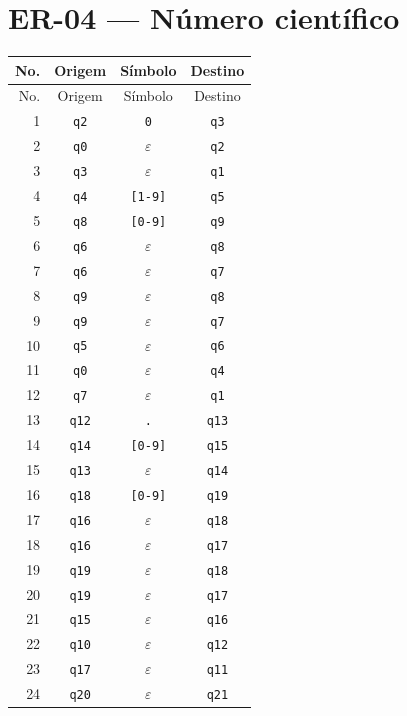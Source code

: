 \documentclass[12pt,a4paper,oneside]{report}
\begin{document}
\section{ER-04 --- Número científico}
\small
\begin{longtable}{|r|c|c|c|}
\toprule
No. & Origem & Símbolo & Destino \\
\midrule
\endfirsthead
\toprule
No. & Origem & Símbolo & Destino \\
\midrule
\endhead
1 & \texttt{q2} & \texttt{0} & \texttt{q3} \\
2 & \texttt{q0} & $\varepsilon$ & \texttt{q2} \\
3 & \texttt{q3} & $\varepsilon$ & \texttt{q1} \\
4 & \texttt{q4} & \texttt{[1-9]} & \texttt{q5} \\
5 & \texttt{q8} & \texttt{[0-9]} & \texttt{q9} \\
6 & \texttt{q6} & $\varepsilon$ & \texttt{q8} \\
7 & \texttt{q6} & $\varepsilon$ & \texttt{q7} \\
8 & \texttt{q9} & $\varepsilon$ & \texttt{q8} \\
9 & \texttt{q9} & $\varepsilon$ & \texttt{q7} \\
10 & \texttt{q5} & $\varepsilon$ & \texttt{q6} \\
11 & \texttt{q0} & $\varepsilon$ & \texttt{q4} \\
12 & \texttt{q7} & $\varepsilon$ & \texttt{q1} \\
13 & \texttt{q12} & \texttt{.} & \texttt{q13} \\
14 & \texttt{q14} & \texttt{[0-9]} & \texttt{q15} \\
15 & \texttt{q13} & $\varepsilon$ & \texttt{q14} \\
16 & \texttt{q18} & \texttt{[0-9]} & \texttt{q19} \\
17 & \texttt{q16} & $\varepsilon$ & \texttt{q18} \\
18 & \texttt{q16} & $\varepsilon$ & \texttt{q17} \\
19 & \texttt{q19} & $\varepsilon$ & \texttt{q18} \\
20 & \texttt{q19} & $\varepsilon$ & \texttt{q17} \\
21 & \texttt{q15} & $\varepsilon$ & \texttt{q16} \\
22 & \texttt{q10} & $\varepsilon$ & \texttt{q12} \\
23 & \texttt{q17} & $\varepsilon$ & \texttt{q11} \\
24 & \texttt{q20} & $\varepsilon$ & \texttt{q21} \\

\end{longtable}
\end{document}
